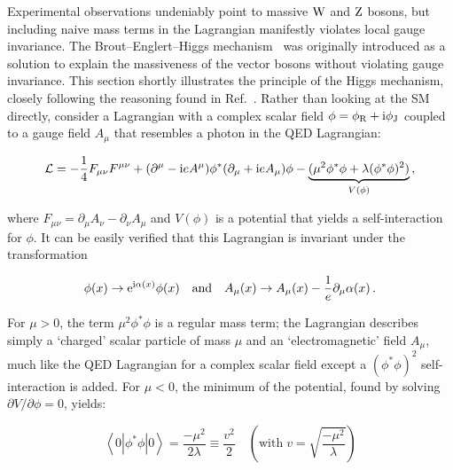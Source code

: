 Experimental observations undeniably point to massive $\mathrm{W}$ and $\mathrm{Z}$ bosons, but including naive mass terms in the Lagrangian manifestly violates local gauge invariance.
% 
The Brout--Englert--Higgs mechanism~\cite{Higgs:1964pj,Englert:1964et,Guralnik:1964eu} was originally introduced as a solution to explain the massiveness of the vector bosons without violating gauge invariance.
% 
This section shortly illustrates the principle of the Higgs mechanism, closely following the reasoning found in Ref.~\cite{Djouadi:2005gi}.
% 
Rather than looking at the SM directly, consider a Lagrangian with a complex scalar field $\phi = \phi_\mathrm{R} + \mathrm{i} \phi_\mathrm{J}$ coupled to a gauge field $A_\mu$ that resembles a photon in the QED Lagrangian:
% 
\begin{linenomath*}
\begin{equation}
\label{eq:lagrangian-higgs}
\mathcal{L} =
    -\frac{1}{4} F_{\mu\nu} F^{\mu\nu}
    + (\partial^\mu - \mathrm{i} e A^\mu) \phi^\ast (\partial_\mu + \mathrm{i} e A_\mu) \phi
    - \underbrace{(\mu^2 \phi^\ast \phi + \lambda (\phi^\ast \phi)^2)}_{V(\phi)}
\,,
\end{equation}
\end{linenomath*}
% 
where $F_{\mu\nu} = \partial_\mu A_\nu - \partial_\nu A_\mu$ and $V(\phi)$ is a potential that yields a self-interaction for $\phi$.
% 
It can be easily verified that this Lagrangian is invariant under the transformation
% 
\begin{linenomath*}
\begin{equation}
\label{eq:transformations-higgs}
\phi(x) \to \mathrm{e}^{\mathrm{i} \alpha(x)} \phi(x)
\quad \text{and} \quad 
A_\mu(x) \to A_\mu(x) - \frac{1}{e} \partial_\mu \alpha(x)
\,.
\end{equation}
\end{linenomath*}
% 
For $\mu > 0$, the term $\mu^2 \phi^\ast \phi$ is a regular mass term; the Lagrangian describes simply a `charged' scalar particle of mass $\mu$ and an `electromagnetic' field $A_\mu$, much like the QED Lagrangian for a complex scalar field except a $(\phi^\ast\phi)^2$ self-interaction is added.
% 
For $\mu < 0$, the minimum of the potential, found by solving $\partial V / \partial \phi = 0$, yields:
% 
\begin{linenomath*}
\begin{equation}
\left< 0 | \phi^\ast\phi | 0 \right> = \frac{-\mu^2}{2\lambda}  \equiv  \frac{v^2}{2}
\quad \left( \text{with} \; v = \sqrt{\frac{-\mu^2}{\lambda}} \right)
\end{equation}
\end{linenomath*}
